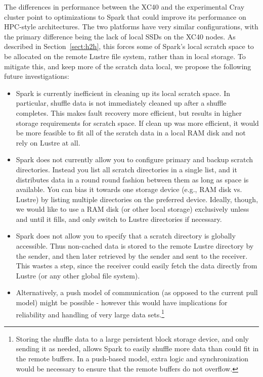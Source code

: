 The differences in performance between the XC40 and the experimental Cray cluster point to optimizations to Spark that could improve its performance on HPC-style architectures.  The two platforms have very similar configurations, with the primary difference being the lack of local SSDs on the XC40 nodes.  As described in Section~\ref{sect:h2h}, this forces some of Spark's local scratch space to be allocated on the remote Lustre file system, rather than in local storage.  To mitigate this, and keep more of the scratch data local, we propose the following future investigations:
\begin{itemize}
\item Spark is currently inefficient in cleaning up its local scratch space.  In particular, shuffle data is not immediately cleaned up after a shuffle completes.  This makes fault recovery more efficient, but results in higher storage requirements for scratch space.  If clean up was more efficient, it would be more feasible to fit all of the scratch data in a local RAM disk and not rely on Lustre at all.
\item Spark does not currently allow you to configure primary and backup scratch directories.  Instead you list all scratch directories in a single list, and it distributes data in a round round fashion between them as long as space is available.  You can bias it towards one storage device (e.g., RAM disk vs. Lustre) by listing multiple directories on the preferred device.  Ideally, though, we would like to use a RAM disk (or other local storage) exclusively unless and until it fills, and only switch to Lustre directories if necessary.
\item Spark does not allow you to specify that a scratch directory is globally accessible.  Thus non-cached data is stored to the remote Lustre directory by the sender, and then later retrieved by the sender and sent to the receiver.  This wastes a step, since the receiver could easily fetch the data directly from Lustre (or any other global file system).
\item Alternatively, a push model of communication (as opposed to the current pull model) might be possible - however this would have implications for reliability and handling of very large data sets.\footnote{Storing the shuffle data to a large persistent block storage device, and only sending it as needed, allows Spark to easily shuffle more data than could fit in the remote buffers.  In a push-based model, extra logic and synchronization would be necessary to ensure that the remote buffers do not overflow.}
\end{itemize}
